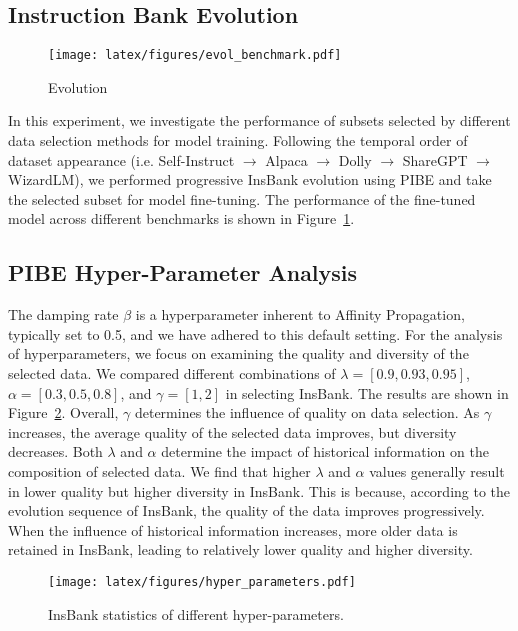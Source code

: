 \subsection{Instruction Bank Evolution}

\begin{figure}[htbp]
  \texttt{[image: latex/figures/evol\_benchmark.pdf]}
  \caption{Evolution}
  \label{fig: evolution}
\end{figure}

In this experiment, we investigate the performance of subsets selected by different data selection methods for model training. Following the temporal order of dataset appearance (i.e. Self-Instruct $\rightarrow$ Alpaca $\rightarrow$ Dolly $\rightarrow$ ShareGPT $\rightarrow$ WizardLM), we performed progressive InsBank evolution using PIBE and take the selected subset for model fine-tuning. The performance of the fine-tuned model across different benchmarks is shown in Figure~\ref{fig: evolution}. 

\subsection{PIBE Hyper-Parameter Analysis}

The damping rate $\beta$ is a hyperparameter inherent to Affinity Propagation, typically set to 0.5, and we have adhered to this default setting. For the analysis of hyperparameters, we focus on examining the quality and diversity of the selected data. We compared different combinations of \(\lambda = [0.9, 0.93, 0.95]\), \(\alpha = [0.3, 0.5, 0.8]\), and \(\gamma = [1, 2]\) in selecting InsBank. The results are shown in Figure~\ref{fig: statistics-hyper}. 
Overall, \(\gamma\) determines the influence of quality on data selection. As \(\gamma\) increases, the average quality of the selected data improves, but diversity decreases. Both \(\lambda\) and \(\alpha\) determine the impact of historical information on the composition of selected data. We find that higher \(\lambda\) and \(\alpha\) values generally result in lower quality but higher diversity in InsBank. This is because, according to the evolution sequence of InsBank, the quality of the data improves progressively. When the influence of historical information increases, more older data is retained in InsBank, leading to relatively lower quality and higher diversity.

\begin{figure}[hbtp]
\texttt{[image: latex/figures/hyper\_parameters.pdf]}
\caption{InsBank statistics of different hyper-parameters.}
\label{fig: statistics-hyper}
\end{figure}


